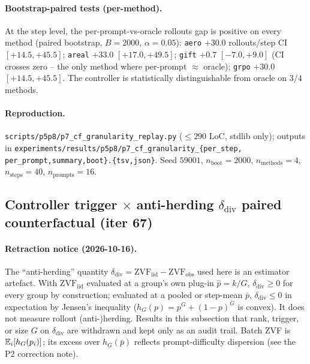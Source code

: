 \paragraph{Bootstrap-paired tests (per-method).}
At the step level, the per-prompt-vs-oracle rollouts gap is
positive on every method (paired bootstrap, $B{=}2000$,
$\alpha{=}0.05$):
\texttt{aero} $+30.0$ rollouts/step CI $[+14.5, +45.5]$;
\texttt{areal} $+33.0$ $[+17.0, +49.5]$; \texttt{gift} $+0.7$
$[-7.0, +9.0]$ (CI crosses zero -- the only method where
per-prompt $\approx$ oracle); \texttt{grpo} $+30.0$ $[+14.5,
+45.5]$. The controller is statistically distinguishable from
oracle on $3/4$ methods.

\paragraph{Reproduction.}
\texttt{scripts/p5p8/p7\_cf\_granularity\_replay.py}
($\leq 290$ LoC, stdlib only); outputs in
\texttt{experiments/results/p5p8/p7\_cf\_granularity\_\{per\_step,
per\_prompt,summary,boot\}.\{tsv,json\}}. Seed $59001$,
$n_{\mathrm{boot}}{=}2000$, $n_{\mathrm{methods}}{=}4$,
$n_{\mathrm{steps}}{=}40$, $n_{\mathrm{prompts}}{=}16$.
\subsection{Controller trigger \texorpdfstring{$\times$}{x} anti-herding \texorpdfstring{$\delta_{\mathrm{div}}$}{\delta\_div}
paired counterfactual (iter 67)}
\label{sec:p7-controller-antiherding}

\paragraph{Retraction notice (2026-10-16).} The ``anti-herding'' quantity
$\delta_{\mathrm{div}}=\mathrm{ZVF}_{\mathrm{iid}}-\mathrm{ZVF}_{\mathrm{obs}}$
used here is an estimator artefact. With $\mathrm{ZVF}_{\mathrm{iid}}$
evaluated at a group's own plug-in $\hat p=k/G$, $\delta_{\mathrm{div}}\ge0$
for every group by construction; evaluated at a pooled or step-mean $\bar p$,
$\delta_{\mathrm{div}}\le0$ in expectation by Jensen's inequality ($h_G(p)=p^G+(1-p)^G$
is convex). It does not measure rollout (anti-)herding. Results in this
subsection that rank, trigger, or size $G$ on $\delta_{\mathrm{div}}$ are
withdrawn and kept only as an audit trail. Batch ZVF is $\mathbb{E}_i[h_G(p_i)]$; its
excess over $h_G(\bar p)$ reflects prompt-difficulty dispersion (see the P2
correction note).


